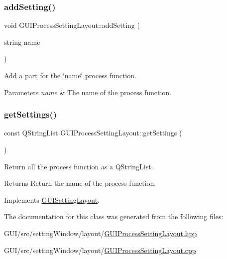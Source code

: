 \subsubsection{\texorpdfstring{add\+Setting()}{addSetting()}}
{\footnotesize\ttfamily void G\+U\+I\+Process\+Setting\+Layout\+::add\+Setting (\begin{DoxyParamCaption}\item[{string}]{name }\end{DoxyParamCaption})}



Add a part for the \char`\"{}name\char`\"{} process function. 


\begin{DoxyParams}{Parameters}
{\em name} & The name of the process function. \\
\hline
\end{DoxyParams}
\mbox{\label{class_g_u_i_process_setting_layout_a17b8110ccb32ba0dcd822ec6fd4f10ac}} 
\subsubsection{\texorpdfstring{get\+Settings()}{getSettings()}}
{\footnotesize\ttfamily const Q\+String\+List G\+U\+I\+Process\+Setting\+Layout\+::get\+Settings (\begin{DoxyParamCaption}{ }\end{DoxyParamCaption})\hspace{0.3cm}{\ttfamily [virtual]}}



Return all the process function as a Q\+String\+List. 

\begin{DoxyReturn}{Returns}
Return the name of the process function. 
\end{DoxyReturn}


Implements \mbox{\hyperlink{class_g_u_i_setting_layout_aa1d7031225076febae3c7779fc82eeaa}{G\+U\+I\+Setting\+Layout}}.



The documentation for this class was generated from the following files\+:\begin{DoxyCompactItemize}
\item 
G\+U\+I/src/setting\+Window/layout/\mbox{\hyperlink{_g_u_i_process_setting_layout_8hpp}{G\+U\+I\+Process\+Setting\+Layout.\+hpp}}\item 
G\+U\+I/src/setting\+Window/layout/\mbox{\hyperlink{_g_u_i_process_setting_layout_8cpp}{G\+U\+I\+Process\+Setting\+Layout.\+cpp}}\end{DoxyCompactItemize}
